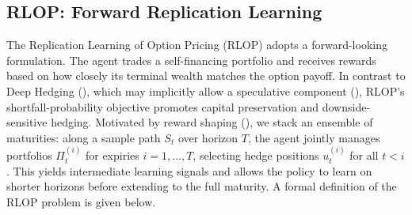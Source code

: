 

\subsection{RLOP: Forward Replication Learning}

The Replication Learning of Option Pricing (RLOP) adopts a forward-looking formulation.
The agent trades a self-financing portfolio and receives rewards based on how closely its terminal wealth matches the option payoff.
In contrast to Deep Hedging (\cite{buehler2019deep}), which may implicitly allow a speculative component (\cite{franccois2025difference}), RLOP’s shortfall-probability objective promotes capital preservation and downside-sensitive hedging.
Motivated by reward shaping (\cite{sutton2018reinforcement}), we stack an ensemble of maturities: along a sample path ${S_t}$ over horizon $T$, the agent jointly manages portfolios $\Pi_t^{(i)}$ for expiries $i=1,\dots,T$, selecting hedge positions $u_t^{(i)}$ for all $t<i$.
This yields intermediate learning signals and allows the policy to learn on shorter horizons before extending to the full maturity.
A formal definition of the RLOP problem is given below.


